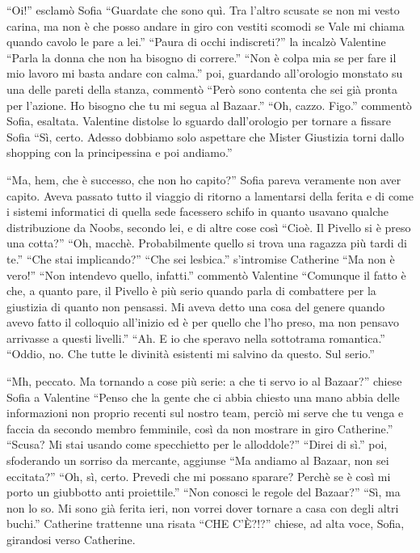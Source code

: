     ``Oi!'' esclamò Sofia ``Guardate che sono quì. Tra l'altro scusate se non mi vesto carina, ma non è che posso andare
    in giro con vestiti scomodi se Vale mi chiama quando cavolo le pare a lei.'' ``Paura di occhi indiscreti?'' la
    incalzò Valentine ``Parla la donna che non ha bisogno di correre.'' ``Non è colpa mia se per fare il mio lavoro mi
    basta andare con calma.'' poi, guardando all'orologio monstato su una delle pareti della stanza, commentò ``Però sono contenta che sei già pronta per
    l'azione. Ho bisogno che tu mi segua al Bazaar.'' ``Oh, cazzo. Figo.'' commentò Sofia, esaltata. Valentine distolse
    lo sguardo dall'orologio per tornare a fissare Sofia ``Sì, certo. Adesso dobbiamo solo aspettare che Mister
    Giustizia torni dallo shopping con la principessina e poi andiamo.''
    
    ``Ma, hem, che è successo, che non ho capito?'' Sofia pareva veramente non aver capito. Aveva passato tutto il
    viaggio di ritorno a lamentarsi della ferita e di come i sistemi informatici di quella sede facessero schifo in quanto usavano
    qualche distribuzione da Noobs, secondo lei, e di altre cose così ``Cioè. Il Pivello si è preso una cotta?'' ``Oh,
    macchè. Probabilmente quello si trova una ragazza più tardi di te.'' ``Che stai implicando?'' ``Che sei lesbica.''
    s'intromise Catherine ``Ma non è vero!'' ``Non intendevo quello, infatti.'' commentò Valentine ``Comunque il fatto è
    che, a quanto pare, il Pivello è più serio quando parla di combattere per la giustizia di quanto non pensassi. Mi
    aveva detto una cosa del genere quando avevo fatto il colloquio all'inizio ed è per quello che l'ho preso, ma non
    pensavo arrivasse a questi livelli.'' ``Ah. E io che speravo nella sottotrama romantica.'' ``Oddio, no. Che tutte le
    divinità esistenti mi salvino da questo. Sul serio.''

    ``Mh, peccato. Ma tornando a cose più serie: a che ti servo io al Bazaar?'' chiese Sofia a Valentine ``Penso che la
    gente che ci abbia chiesto una mano abbia delle informazioni non proprio recenti sul nostro team, perciò mi serve
    che tu venga e faccia da secondo membro femminile, così da non mostrare in giro Catherine.'' ``Scusa? Mi stai usando
    come specchietto per le alloddole?'' ``Direi di sì.'' poi, sfoderando un sorriso da mercante, aggiunse ``Ma andiamo
    al Bazaar, non sei eccitata?'' ``Oh, sì, certo. Prevedi che mi possano sparare? Perchè se è così mi porto un
    giubbotto anti proiettile.'' ``Non conosci le regole del Bazaar?'' ``Sì, ma non lo so. Mi sono già ferita ieri, non
    vorrei dover tornare a casa con degli altri buchi.'' Catherine trattenne una risata ``CHE C'È?!?'' chiese, ad alta
    voce, Sofia, girandosi verso Catherine.

